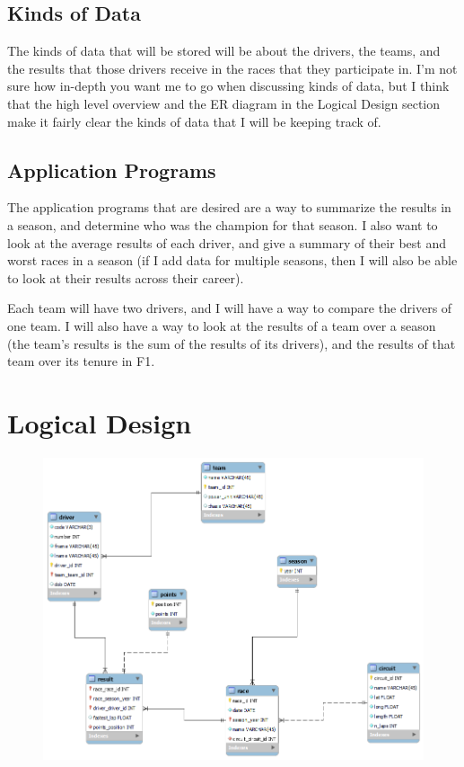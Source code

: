 \documentclass{article} %
\begin{document}
\subsection{Kinds of Data}
The kinds of data that will be stored will be about the drivers, the
teams, and the results that those drivers receive in the races that they
participate in. I'm not sure how in-depth you want me to go when
discussing kinds of data, but I think that the high level overview and
the ER diagram in the Logical Design section make it fairly clear the
kinds of data that I will be keeping track of. 

\subsection{Application Programs}
The application programs that are desired are a way to summarize the
results in a season, and determine who was the champion for that season.
I also want to look at the average results of each driver, and give a
summary of their best and worst races in a season (if I add data for
multiple seasons, then I will also be able to look at their results
across their career).

Each team will have two drivers, and I will have a way to compare the
drivers of one team. I will also have a way to look at the results of a
team over a season (the team's results is the sum of the results of its
drivers), and the results of that team over its tenure in F1.


\section{Logical Design}

\begin{figure}[H]
    \centering
    \includegraphics[scale=0.4]{f1db.png}
\end{figure}
\end{document}
